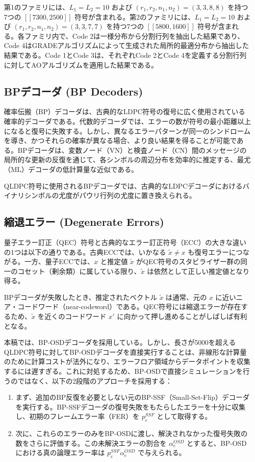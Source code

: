 \documentclass[a4paper,11pt]{article}
\begin{document}
第1のファミリには、$L_1=L_2=10$ および $(r_1, r_2, n_1, n_2) = (3, 3, 8, 8)$ を持つ7つの $[[7300, 2500]]$ 符号が含まれる。第2のファミリには、$L_1=L_2=10$ および $(r_1, r_2, n_1, n_2) = (3, 3, 7, 7)$ を持つ7つの $[[5800, 1600]]$ 符号が含まれる。各ファミリ内で、Code 2は一様分布から分割行列を抽出した結果であり、Code 4はGRADEアルゴリズムによって生成された局所的最適分布から抽出した結果である。Code 1とCode 3は、それぞれCode 2とCode 4を定義する分割行列に対してAOアルゴリズムを適用した結果である。

\subsection{BPデコーダ (BP Decoders)}
確率伝搬（BP）デコーダは、古典的なLDPC符号の復号に広く使用されている確率的デコーダである。代数的デコーダでは、エラーの数が符号の最小距離以上になると復号に失敗する。しかし、異なるエラーパターンが同一のシンドロームを導き、かつそれらの確率が異なる場合、より良い結果を得ることが可能である。BPデコーダは、変数ノード（VN）と検査ノード（CN）間のメッセージの局所的な更新の反復を通じて、各シンボルの周辺分布を効率的に推定する、最尤（ML）デコーダの低計算量な近似である。

QLDPC符号に使用されるBPデコーダでは、古典的なLDPCデコーダにおけるバイナリシンボルの尤度がパウリ行列の尤度に置き換えられる。

\subsection{縮退エラー (Degenerate Errors)}
量子エラー訂正（QEC）符号と古典的なエラー訂正符号（ECC）の大きな違いの1つは以下の通りである。古典ECCでは、いかなる $\tilde{x} \neq x$ も復号エラーにつながる。一方、量子ECCでは、$x$ と推定値 $\tilde{x}$ がQEC符号のスタビライザー群の同一のコセット（剰余類）に属している限り、$\tilde{x}$ は依然として正しい推定値となり得る。

BPデコーダが失敗したとき、推定されたベクトル $\tilde{x}$ は通常、元の $x$ に近いニア・コードワード（near-codeword）である。QEC符号には縮退エラーが存在するため、$\tilde{x}$ を近くのコードワード $x'$ に向かって押し進めることがしばしば有利となる。

本稿では、BP-OSDデコーダを採用している。しかし、長さが5000を超えるQLDPC符号に対してBP-OSDデコーダを直接実行することは、非線形な計算量のために計算コストが法外になり、エラーフロア領域からデータポイントを収集するには遅すぎる。これに対処するため、BP-OSDで直接シミュレーションを行うのではなく、以下の2段階のアプローチを採用する：
\begin{enumerate}
    \item まず、追加のBP反復を必要としない元のBP-SSF（Small-Set-Flip）デコーダを実行する。BP-SSFデコーダの復号失敗をもたらしたエラーを十分に収集し、初期のフレームエラー率（FER）を $p_e^{SSF}$ として取得する。
    \item 次に、これらのエラーのみをBP-OSDに渡し、解決されなかった復号失敗の数をさらに評価する。この未解決エラーの割合を $\alpha_e^{OSD}$ とすると、BP-OSDにおける真の論理エラー率は $p_e^{SSF}\alpha_e^{OSD}$ で与えられる。
\end{enumerate}
\end{document}
